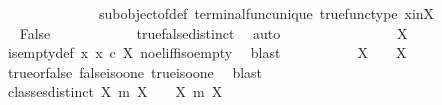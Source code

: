 \begin{isabellebody}
\ \ \ \ \ \ \ \ \ \ \ \ \ \ subobject{\isacharunderscore}{\kern0pt}of{\isacharunderscore}{\kern0pt}def{}\ terminal{\isacharunderscore}{\kern0pt}func{\isacharunderscore}{\kern0pt}unique\ true{\isacharunderscore}{\kern0pt}func{\isacharunderscore}{\kern0pt}type\ x{\isacharunderscore}{\kern0pt}in{\isacharunderscore}{\kern0pt}X{\isacharparenright}{\kern0pt}\isanewline
\ \ \ \ \ \ \ \ \isamarkupfalse%
\ \isamarkupfalse%
\ False\isanewline
\ \ \ \ \ \ \ \ \ \ \isamarkupfalse%
\ true{\isacharunderscore}{\kern0pt}false{\isacharunderscore}{\kern0pt}distinct\ \isamarkupfalse%
\ auto\isanewline
\ \ \ \ \ \ \isamarkupfalse%
\isanewline
\ \ \ \ \ \ \isamarkupfalse%
\ \isamarkupfalse%
\ {\isachardoublequoteopen}X\ {\isasymcong}\ {\isasymemptyset}{\isachardoublequoteclose}\isanewline
\ \ \ \ \ \ \ \ \isamarkupfalse%
\ is{\isacharunderscore}{\kern0pt}empty{\isacharunderscore}{\kern0pt}def\ {\isacartoucheopen}{\isasymnexists}x{\isachardot}{\kern0pt}\ x\ {\isasymin}\isactrlsub c\ X{\isacartoucheclose}\ no{\isacharunderscore}{\kern0pt}el{\isacharunderscore}{\kern0pt}iff{\isacharunderscore}{\kern0pt}iso{\isacharunderscore}{\kern0pt}empty\ \isamarkupfalse%
\ blast\isanewline
\ \ \ \ \isamarkupfalse%
\isanewline
\isanewline
\ \ \ \ \isamarkupfalse%
\ {\isachardoublequoteopen}X\ {\isasymcong}\ {\isasymone}\ {\isasymor}\ X\ {\isasymcong}\ {\isasymemptyset}{\isachardoublequoteclose}\isanewline
\ \ \ \ \ \ \isamarkupfalse%
\ {\isasymchi}{\isacharunderscore}{\kern0pt}true{\isacharunderscore}{\kern0pt}or{\isacharunderscore}{\kern0pt}false\ false{\isacharunderscore}{\kern0pt}iso{\isacharunderscore}{\kern0pt}one\ true{\isacharunderscore}{\kern0pt}iso{\isacharunderscore}{\kern0pt}one\ \isamarkupfalse%
\ blast\isanewline
\ \ \isamarkupfalse%
\isanewline
\isanewline
\ \ \isamarkupfalse%
\ classes{\isacharunderscore}{\kern0pt}distinct{\isacharcolon}{\kern0pt}\ {\isachardoublequoteopen}{\isacharbraceleft}{\kern0pt}{\isacharparenleft}{\kern0pt}X{\isacharcomma}{\kern0pt}\ m{\isacharparenright}{\kern0pt}{\isachardot}{\kern0pt}\ X\ {\isasymcong}\ {\isasymemptyset}{\isacharbraceright}{\kern0pt}\ {\isasymnoteq}\ {\isacharbraceleft}{\kern0pt}{\isacharparenleft}{\kern0pt}X{\isacharcomma}{\kern0pt}\ m{\isacharparenright}{\kern0pt}{\isachardot}{\kern0pt}\ X\ {\isasymcong}\ {\isasymone}{\isacharbraceright}{\kern0pt}{\isachardoublequoteclose}\isanewline

\end{isabellebody}

